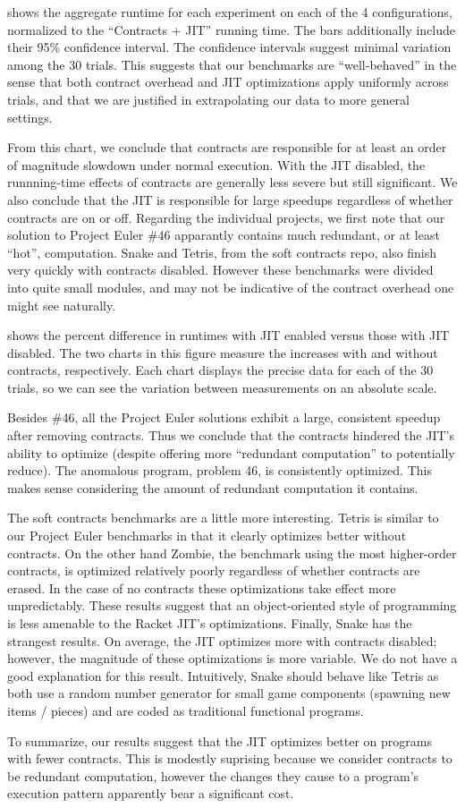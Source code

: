 

 shows the aggregate runtime for each experiment on each of the 4 configurations, normalized to the ``Contracts + JIT'' running time.
The bars additionally include their 95\% confidence interval.
The confidence intervals suggest minimal variation among the 30 trials.
This suggests that our benchmarks are ``well-behaved'' in the sense that both contract overhead and JIT optimizations apply uniformly across trials, and that we are justified in extrapolating our data to more general settings.

From this chart, we conclude that contracts are responsible for at least an order of magnitude slowdown under normal execution.
With the JIT disabled, the runnning-time effects of contracts are generally less severe but still significant.
We also conclude that the JIT is responsible for large speedups regardless of whether contracts are on or off.
Regarding the individual projects, we first note that our solution to Project Euler \#46 apparantly contains much redundant, or at least ``hot'', computation.
Snake and Tetris, from the soft contracts repo, also finish very quickly with contracts disabled.
However these benchmarks were divided into quite small modules, and may not be indicative of the contract overhead one might see naturally.

\newpage


 shows the percent difference in runtimes with JIT enabled versus those with JIT disabled.
The two charts in this figure measure the increases with and without contracts, respectively.
Each chart displays the precise data for each of the 30 trials, so we can see the variation between measurements on an absolute scale.

Besides \#46, all the Project Euler solutions exhibit a large, consistent speedup after removing contracts.
Thus we conclude that the contracts hindered the JIT's ability to optimize (despite offering more ``redundant computation'' to potentially reduce).
The anomalous program, problem 46, is consistently optimized.
This makes sense considering the amount of redundant computation it contains.

The soft contracts benchmarks are a little more interesting.
Tetris is similar to our Project Euler benchmarks in that it clearly optimizes better without contracts.
On the other hand Zombie, the benchmark using the most higher-order contracts, is optimized relatively poorly regardless of whether contracts are erased.
In the case of no contracts these optimizations take effect more unpredictably.
These results suggest that an object-oriented style of programming is less amenable to the Racket JIT's optimizations.
Finally, Snake has the strangest results.
On average, the JIT optimizes more with contracts disabled; however, the magnitude of these optimizations is more variable.
We do not have a good explanation for this result.
Intuitively, Snake should behave like Tetris as both use a random number generator for small game components (spawning new items / pieces) and are coded as traditional functional programs.

To summarize, our results suggest that the JIT optimizes better on programs with fewer contracts.
This is modestly suprising because we consider contracts to be redundant computation, however the changes they cause to a program's execution pattern apparently bear a significant cost.

